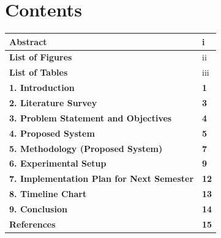 \documentclass[12pt]{article}
\begin{document}
\newpage
\section*{Contents}
\begin{center}
\setlength{\extrarowheight}{0.5cm} 
\begin{tabular}{|>{\raggedright\arraybackslash}p{}|>{\raggedright\arraybackslash}p{}|} 
\hline 
\textbf{Abstract} & i \\ \hline
\textbf{List of Figures} & ii \\ \hline
\textbf{List of Tables} & iii \\ \hline
\textbf{1. Introduction} & \textbf{1}  \\ \hline
\textbf{2. Literature Survey} & \textbf{3}\\ \hline
\textbf{3. Problem Statement and Objectives} & \textbf{4}\\ \hline
\textbf{4. Proposed System} & \textbf{5}\\ \hline
\textbf{5. Methodology (Proposed System)} & \textbf{7} \\ \hline
\textbf{6. Experimental Setup} & \textbf{9} \\ \hline
\textbf{7. Implementation Plan for Next Semester} & \textbf{12} \\ \hline
\textbf{8. Timeline Chart} & \textbf{13} \\ \hline
\textbf{9. Conclusion} & \textbf{14} \\ \hline
\textbf{References} & \textbf{15} \\ \hline
\end{tabular}
\end{center}
\thispagestyle{empty}

\newpage
{}
\setcounter{page}{1}
\end{document}
